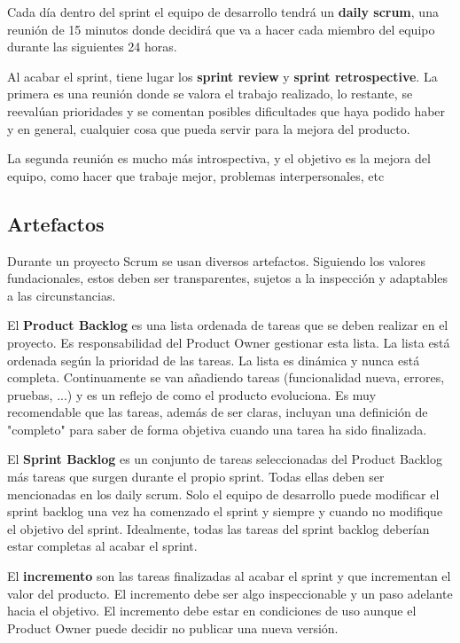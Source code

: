 \documentclass[12pt]{report} %
\begin{document}
Cada día dentro del sprint el equipo de desarrollo tendrá un \textbf{daily scrum}, una reunión de 15 minutos donde decidirá que va a hacer cada miembro del equipo durante las siguientes 24 horas.

Al acabar el sprint, tiene lugar los \textbf{sprint review} y \textbf{sprint retrospective}. La primera es una reunión donde se valora el trabajo realizado, lo restante, se reevalúan prioridades y se comentan posibles dificultades que haya podido haber y en general, cualquier cosa que pueda servir para la mejora del producto.

La segunda reunión es mucho más introspectiva, y el objetivo es la mejora del equipo, como hacer que trabaje mejor, problemas interpersonales, etc

\subsection{Artefactos}

Durante un proyecto Scrum se usan diversos artefactos. Siguiendo los valores fundacionales, estos deben ser transparentes, sujetos a la inspección y adaptables a las circunstancias.

El \textbf{Product Backlog} es una lista ordenada de tareas que se deben realizar en el proyecto. Es responsabilidad del Product Owner gestionar esta lista. La lista está ordenada según la prioridad de las tareas. La lista es dinámica y nunca está completa. Continuamente se van añadiendo tareas (funcionalidad nueva, errores, pruebas, ...) y es un reflejo de como el producto evoluciona. Es muy recomendable que las tareas, además de ser claras, incluyan una definición de "completo" para saber de forma objetiva cuando una tarea ha sido finalizada.

El \textbf{Sprint Backlog} es un conjunto de tareas seleccionadas del Product Backlog más tareas que surgen durante el propio sprint. Todas ellas deben ser mencionadas en los daily scrum. Solo el equipo de desarrollo puede modificar el sprint backlog una vez ha comenzado el sprint y siempre y cuando no modifique el objetivo del sprint. Idealmente, todas las tareas del sprint backlog deberían estar completas al acabar el sprint.

El \textbf{incremento} son las tareas finalizadas al acabar el sprint y que incrementan el valor del producto. El incremento debe ser algo inspeccionable y un paso adelante hacia el objetivo. El incremento debe estar en condiciones de uso aunque el Product Owner puede decidir no publicar una nueva versión.
\end{document}
